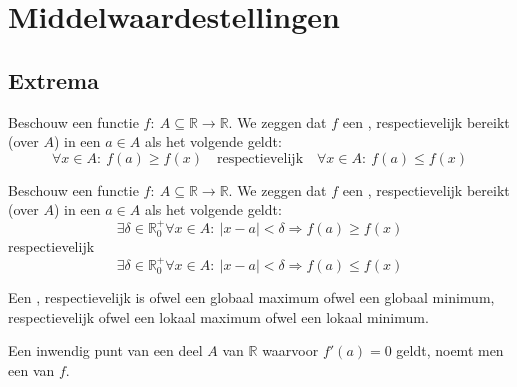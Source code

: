 \documentclass[main.tex]{subfiles}
\begin{document}
\section{Middelwaardestellingen}
\label{sec:midd-van-rolle}

\subsection{Extrema}
\label{sec:extrema}

\begin{de}
  Beschouw een functie $f:\ A \subseteq \mathbb{R} \rightarrow \mathbb{R}$.
  We zeggen dat $f$ een , respectievelijk  bereikt (over $A$) in een $a\in A$ als het volgende geldt:
  \[ \forall x\in A:\ f(a) \ge f(x) \quad\text{respectievelijk}\quad \forall x\in A:\ f(a) \le f(x)\]
\end{de}

\begin{de}
  Beschouw een functie $f:\ A \subseteq \mathbb{R} \rightarrow \mathbb{R}$.
  We zeggen dat $f$ een , respectievelijk  bereikt (over $A$) in een $a\in A$ als het volgende geldt:
  \[ \exists \delta \in \mathbb{R}_{0}^{+}\forall x\in A:\ |x-a| < \delta \Rightarrow f(a) \ge f(x)\]
  respectievelijk
  \[ \exists \delta \in \mathbb{R}_{0}^{+}\forall x\in A:\ |x-a| < \delta \Rightarrow f(a) \le f(x)\]
\end{de}

\begin{de}
  Een , respectievelijk  is ofwel een globaal maximum ofwel een globaal minimum, respectievelijk ofwel een lokaal maximum ofwel een lokaal minimum.
\end{de}

\begin{de}
  \label{de:kritiek-punt}
  Een inwendig punt van een deel $A$ van $\mathbb{R}$ waarvoor $f'(a)=0$ geldt, noemt men een  van $f$.
\end{de}
\end{document}
